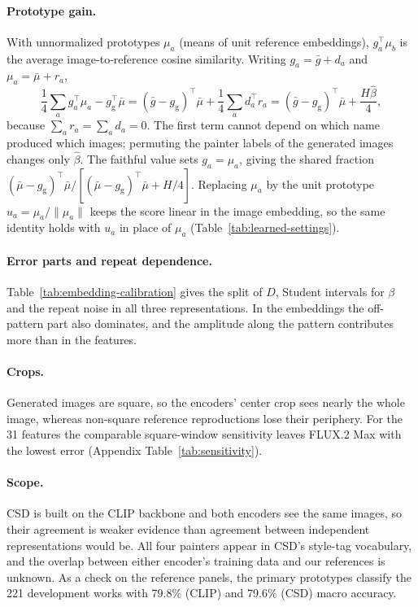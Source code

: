 \paragraph{Prototype gain.} With unnormalized prototypes $\mu_a$ (means of unit reference
embeddings), $g_a^\top\mu_b$ is the average image-to-reference cosine similarity. Writing
$g_a=\bar g+d_a$ and $\mu_a=\bar\mu+r_a$,
\begin{equation}
\frac14\sum_a g_a^\top\mu_a-g_{\mathrm g}^\top\bar\mu
=(\bar g-g_{\mathrm g})^\top\bar\mu+\frac14\sum_a d_a^\top r_a
=(\bar g-g_{\mathrm g})^\top\bar\mu+\frac{H\widehat\beta}{4},
\end{equation}
because $\sum_a r_a=\sum_a d_a=0$. The first term cannot depend on which name produced which
images; permuting the painter labels of the generated images changes only $\widehat\beta$. The
faithful value sets $g_a=\mu_a$, giving the shared fraction $(\bar\mu-g_{\mathrm
g})^\top\bar\mu/[(\bar\mu-g_{\mathrm g})^\top\bar\mu+H/4]$. Replacing $\mu_a$ by the unit
prototype $u_a=\mu_a/\|\mu_a\|$ keeps the score linear in the image embedding, so the same
identity holds with $u_a$ in place of $\mu_a$ (Table~\ref{tab:learned-settings}).







\paragraph{Error parts and repeat dependence.} Table~\ref{tab:embedding-calibration} gives the split
of $D$, Student intervals for $\beta$ and the repeat noise in all three representations. In the
embeddings the off-pattern part also dominates, and the amplitude along the pattern contributes
more than in the features.

\paragraph{Crops.} Generated images are square, so the encoders' center crop sees nearly the whole
image, whereas non-square reference reproductions lose their periphery. For the 31 features the
comparable square-window sensitivity leaves FLUX.2 Max with the lowest error (Appendix
Table~\ref{tab:sensitivity}).

\paragraph{Scope.} CSD is built on the CLIP backbone and both encoders see the same images, so
their agreement is weaker evidence than agreement between independent representations would be. All
four painters appear in CSD's style-tag vocabulary, and the overlap between either encoder's
training data and our references is unknown. As a check on the reference panels, the primary
prototypes classify the 221 development works with 79.8\% (CLIP) and 79.6\% (CSD) macro
accuracy.

